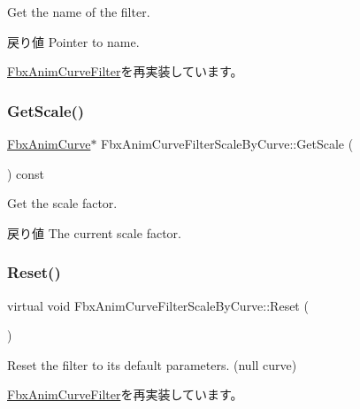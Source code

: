 Get the name of the filter. \begin{DoxyReturn}{戻り値}
Pointer to name. 
\end{DoxyReturn}


\hyperlink{class_fbx_anim_curve_filter_abd559d5052fbb072042e59241940a35c}{Fbx\+Anim\+Curve\+Filter}を再実装しています。

\mbox{\label{class_fbx_anim_curve_filter_scale_by_curve_a966f86d57bd088700341223a85fe27a0}} 
\subsubsection{\texorpdfstring{Get\+Scale()}{GetScale()}}
{\footnotesize\ttfamily \hyperlink{class_fbx_anim_curve}{Fbx\+Anim\+Curve}$\ast$ Fbx\+Anim\+Curve\+Filter\+Scale\+By\+Curve\+::\+Get\+Scale (\begin{DoxyParamCaption}{ }\end{DoxyParamCaption}) const}

Get the scale factor. \begin{DoxyReturn}{戻り値}
The current scale factor. 
\end{DoxyReturn}
\mbox{\label{class_fbx_anim_curve_filter_scale_by_curve_afa7aab42520287edf327d78dcbbb0d01}} 
\subsubsection{\texorpdfstring{Reset()}{Reset()}}
{\footnotesize\ttfamily virtual void Fbx\+Anim\+Curve\+Filter\+Scale\+By\+Curve\+::\+Reset (\begin{DoxyParamCaption}{ }\end{DoxyParamCaption})\hspace{0.3cm}{\ttfamily [virtual]}}

Reset the filter to its default parameters. (null curve) 

\hyperlink{class_fbx_anim_curve_filter_a57fb35baaaa85adb08946383cf40e811}{Fbx\+Anim\+Curve\+Filter}を再実装しています。

